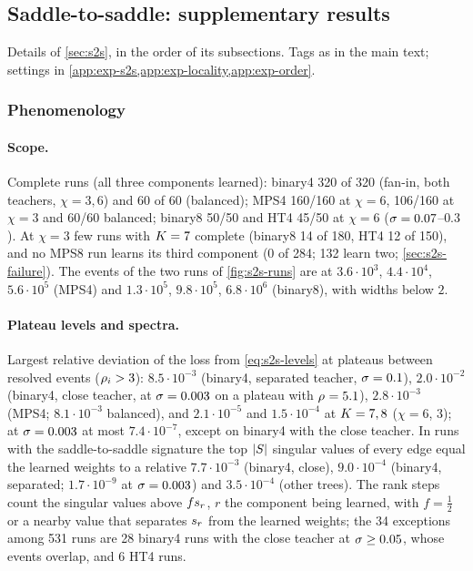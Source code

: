 \subsection{Saddle-to-saddle: supplementary results}\label{app:supp-s2s}

Details of \cref{sec:s2s}, in the order of its subsections. Tags as in the main text; settings in
\cref{app:exp-s2s,app:exp-locality,app:exp-order}.

\subsubsection{Phenomenology}\label{app:supp-s2s-phen}

\paragraph{Scope.}
\empirical{} Complete runs (all three components learned): binary4 320 of 320 (fan-in, both teachers, $\chi=3,6$) and
60 of 60 (balanced); MPS4 160/160 at $\chi=6$, 106/160 at $\chi=3$ and 60/60 balanced; binary8 50/50 and HT4 45/50 at
$\chi=6$ ($\sigma=0.07$--$0.3$). At $\chi=3$ few runs with $K=7$ complete (binary8 14 of 180, HT4 12 of 150), and no
MPS8 run learns its third component (0 of 284; 132 learn two; \cref{sec:s2s-failure}). The events of the two runs of
\cref{fig:s2s-runs} are at $3.6\cdot10^3$, $4.4\cdot10^4$, $5.6\cdot10^5$ (MPS4) and $1.3\cdot10^5$, $9.8\cdot10^5$,
$6.8\cdot10^6$ (binary8), with widths below $2$.

\paragraph{Plateau levels and spectra.}
\empirical{} Largest relative deviation of the loss from \eqref{eq:s2s-levels} at plateaus between resolved events
($\rho_{i}>3$): $8.5\cdot10^{-3}$ (binary4, separated teacher, $\sigma=0.1$), $2.0\cdot10^{-2}$ (binary4, close teacher,
at $\sigma=0.003$ on a plateau with $\rho_{}=5.1$), $2.8\cdot10^{-3}$ (MPS4; $8.1\cdot10^{-3}$ balanced), and
$2.1\cdot10^{-5}$ and $1.5\cdot10^{-4}$ at $K=7,8$ ($\chi=6$, $3$); at $\sigma=0.003$ at most $7.4\cdot10^{-7}$,
except on binary4 with the close teacher. In runs with the saddle-to-saddle signature the top $\lvert S\rvert$ singular
values of every edge equal the learned weights to a relative $7.7\cdot10^{-3}$ (binary4, close), $9.0\cdot10^{-4}$
(binary4, separated; $1.7\cdot10^{-9}$ at $\sigma=0.003$) and $3.5\cdot10^{-4}$ (other trees). The rank steps count
the singular values above $fs_{r}$, $r$ the component being learned, with $f=\frac12$ or a nearby value that
separates $s_{r}$ from the learned weights; the 34 exceptions among 531 runs are 28 binary4 runs with the close
teacher at $\sigma\ge0.05$, whose events overlap, and 6 HT4 runs.

